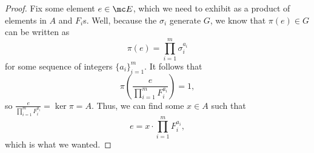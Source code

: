 \begin{proof}
	Fix some element $e\in\mc E$, which we need to exhibit as a product of elements in $A$ and $F_i$s. Well, because the $\sigma_i$ generate $ G$, we know that $\pi(e)\in G$ can be written as
	\[\pi(e)=\prod_{i=1}^m\sigma_i^{a_i}\]
	for some sequence of integers $\{a_i\}_{i=1}^m$. It follows that
	\[\pi\left(\frac e{\prod_{i=1}^mF_i^{a_i}}\right)=1,\]
	so $\frac e{\prod_{i=1}^mF_i^{a_i}}=\ker\pi=A$. Thus, we can find some $x\in A$ such that
	\[e=x\cdot\prod_{i=1}^mF_i^{a_i},\]
	which is what we wanted.
\end{proof}